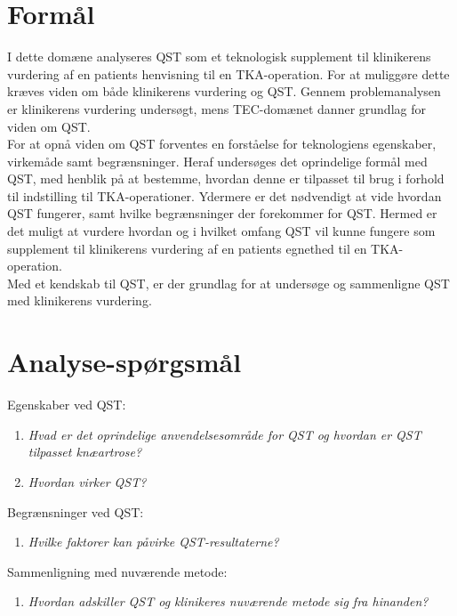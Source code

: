 \section{Formål} 
I dette domæne analyseres QST som et teknologisk supplement til klinikerens vurdering af en patients henvisning til en TKA-operation. For at muliggøre dette kræves viden om både klinikerens vurdering og QST. Gennem problemanalysen er klinikerens vurdering undersøgt, mens TEC-domænet danner grundlag for viden om QST.\\
For at opnå viden om QST forventes en forståelse for teknologiens egenskaber, virkemåde samt begrænsninger. Heraf undersøges det oprindelige formål med QST, med henblik på at bestemme, hvordan denne er tilpasset til brug i forhold til indstilling til TKA-operationer. Ydermere er det nødvendigt at vide hvordan QST fungerer, samt hvilke begrænsninger der forekommer for QST. Hermed er det muligt at vurdere hvordan og i hvilket omfang QST vil kunne fungere som supplement til klinikerens vurdering af en patients egnethed til en TKA-operation.\\
Med et kendskab til QST, er der grundlag for at undersøge og sammenligne QST med klinikerens vurdering. 

\section{Analyse-spørgsmål}
Egenskaber ved QST:
\begin{enumerate}
	\item \textit{Hvad er det oprindelige anvendelsesområde for QST og hvordan er QST tilpasset knæartrose?} %
	\item \textit{Hvordan virker QST?}  %
\end{enumerate}
Begrænsninger ved QST:
\begin{enumerate}[resume]
	\item \textit{Hvilke faktorer kan påvirke QST-resultaterne?}
\end{enumerate}
Sammenligning med nuværende metode:
\begin{enumerate}[resume]
	\item \textit{Hvordan adskiller QST og klinikeres nuværende metode sig fra hinanden?} %
\end{enumerate}


